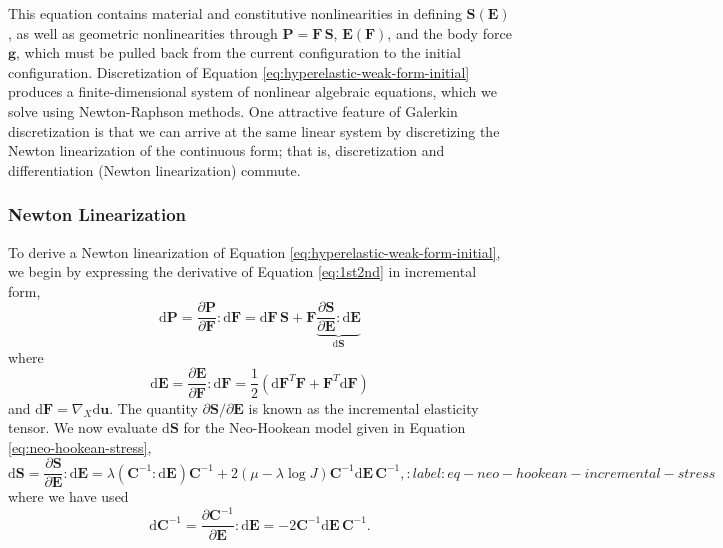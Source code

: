 This equation contains material and constitutive nonlinearities in defining $\mathbf S \left( \mathbf E \right)$, as well as geometric nonlinearities through $\mathbf P = \mathbf F\, \mathbf S$, $\mathbf E \left( \mathbf F \right)$, and the body force $\mathbf g$, which must be pulled back from the current configuration to the initial configuration.
Discretization of Equation \ref{eq:hyperelastic-weak-form-initial} produces a finite-dimensional system of nonlinear algebraic equations, which we solve using Newton-Raphson methods.
One attractive feature of Galerkin discretization is that we can arrive at the same linear system by discretizing the Newton linearization of the continuous form; that is, discretization and differentiation (Newton linearization) commute.

\subsubsection{Newton Linearization}

To derive a Newton linearization of Equation \ref{eq:hyperelastic-weak-form-initial}, we begin by expressing the derivative of Equation \ref{eq:1st2nd} in incremental form,
\begin{equation}
   \text{d} \mathbf P = \frac{\partial \mathbf P}{\partial \mathbf F} \!:\! \text{d} \mathbf F = \text{d} \mathbf F\, \mathbf S + \mathbf F \underbrace{\frac{\partial \mathbf S}{\partial \mathbf E} \!:\! \text{d} \mathbf E}_{\text{d} \mathbf S}
   \label{eq:diff-P}
\end{equation}
where
\begin{equation}
   \text{d} \mathbf E = \frac{\partial \mathbf E}{\partial \mathbf F} \!:\! \text{d} \mathbf F = \frac 1 2 \left( \text{d} \mathbf F^T \mathbf F + \mathbf F^T \text{d} \mathbf F \right)
\end{equation}
and $\text{d}\mathbf F = \nabla_X\text{d}\mathbf u$.
The quantity ${\partial \mathbf S} / {\partial \mathbf E}$ is known as the incremental elasticity tensor.
We now evaluate $\text{d} \mathbf S$ for the Neo-Hookean model given in Equation \ref{eq:neo-hookean-stress},
\begin{equation}
   \text{d}\mathbf S = \frac{\partial \mathbf S}{\partial \mathbf E} \!:\! \text{d} \mathbf E
   = \lambda \left(\mathbf C^{-1} \!:\! \text{d}\mathbf E \right) \mathbf C^{-1}
     + 2 \left(\mu - \lambda \log J \right) \mathbf C^{-1} \text{d}\mathbf E \, \mathbf C^{-1},
   :label: eq-neo-hookean-incremental-stress
\end{equation}
where we have used
\begin{equation}
   \text{d} \mathbf C^{-1} = \frac{\partial \mathbf C^{-1}}{\partial \mathbf E} \!:\! \text{d}\mathbf E
   = -2 \mathbf C^{-1} \text{d} \mathbf E \, \mathbf C^{-1} .
\end{equation}

